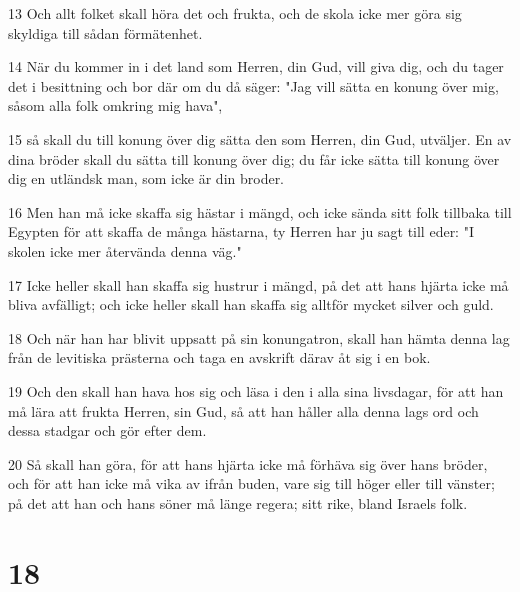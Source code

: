 \par 13 Och allt folket skall höra det och frukta, och de skola icke mer göra sig skyldiga till sådan förmätenhet.
\par 14 När du kommer in i det land som Herren, din Gud, vill giva dig, och du tager det i besittning och bor där om du då säger: "Jag vill sätta en konung över mig, såsom alla folk omkring mig hava",
\par 15 så skall du till konung över dig sätta den som Herren, din Gud, utväljer. En av dina bröder skall du sätta till konung över dig; du får icke sätta till konung över dig en utländsk man, som icke är din broder.
\par 16 Men han må icke skaffa sig hästar i mängd, och icke sända sitt folk tillbaka till Egypten för att skaffa de många hästarna, ty Herren har ju sagt till eder: "I skolen icke mer återvända denna väg."
\par 17 Icke heller skall han skaffa sig hustrur i mängd, på det att hans hjärta icke må bliva avfälligt; och icke heller skall han skaffa sig alltför mycket silver och guld.
\par 18 Och när han har blivit uppsatt på sin konungatron, skall han hämta denna lag från de levitiska prästerna och taga en avskrift därav åt sig i en bok.
\par 19 Och den skall han hava hos sig och läsa i den i alla sina livsdagar, för att han må lära att frukta Herren, sin Gud, så att han håller alla denna lags ord och dessa stadgar och gör efter dem.
\par 20 Så skall han göra, för att hans hjärta icke må förhäva sig över hans bröder, och för att han icke må vika av ifrån buden, vare sig till höger eller till vänster; på det att han och hans söner må länge regera; sitt rike, bland Israels folk.

\chapter{18}

